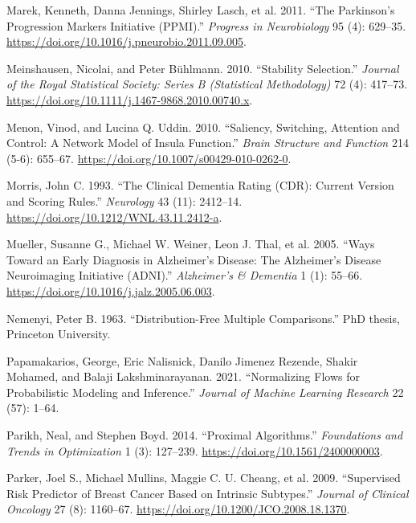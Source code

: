 \documentclass[
  10pt,
  letterpaper,
]{report}
\newlength{\cslhangindent}
\newenvironment{CSLReferences}[2] %
 {\begin{list}{}{%
  \setlength{\itemindent}{0pt}
  \setlength{\leftmargin}{0pt}
  \setlength{\parsep}{0pt}
  \ifodd #1
   \setlength{\leftmargin}{\cslhangindent}
   \setlength{\itemindent}{-1\cslhangindent}
  \fi
  \setlength{\itemsep}{#2\baselineskip}}}
 {\end{list}}
\begin{document}
\begin{CSLReferences}{1}{1}
{Marek, Kenneth, Danna Jennings, Shirley Lasch, et al.} 2011. {``The
{Parkinson's Progression Markers Initiative} ({PPMI}).''} \emph{Progress
in Neurobiology} 95 (4): 629--35.
\url{https://doi.org/10.1016/j.pneurobio.2011.09.005}.

Meinshausen, Nicolai, and Peter Bühlmann. 2010. {``Stability
Selection.''} \emph{Journal of the Royal Statistical Society: Series B
(Statistical Methodology)} 72 (4): 417--73.
\url{https://doi.org/10.1111/j.1467-9868.2010.00740.x}.

Menon, Vinod, and Lucina Q. Uddin. 2010. {``Saliency, Switching,
Attention and Control: A Network Model of Insula Function.''}
\emph{Brain Structure and Function} 214 (5-6): 655--67.
\url{https://doi.org/10.1007/s00429-010-0262-0}.

Morris, John C. 1993. {``The {Clinical Dementia Rating} ({CDR}): Current
Version and Scoring Rules.''} \emph{Neurology} 43 (11): 2412--14.
\url{https://doi.org/10.1212/WNL.43.11.2412-a}.

Mueller, Susanne G., Michael W. Weiner, Leon J. Thal, et al. 2005.
{``Ways Toward an Early Diagnosis in {Alzheimer's} Disease: The
{Alzheimer's Disease Neuroimaging Initiative} ({ADNI}).''}
\emph{Alzheimer's \& Dementia} 1 (1): 55--66.
\url{https://doi.org/10.1016/j.jalz.2005.06.003}.

Nemenyi, Peter B. 1963. {``Distribution-Free Multiple Comparisons.''}
PhD thesis, Princeton University.

Papamakarios, George, Eric Nalisnick, Danilo Jimenez Rezende, Shakir
Mohamed, and Balaji Lakshminarayanan. 2021. {``Normalizing Flows for
Probabilistic Modeling and Inference.''} \emph{Journal of Machine
Learning Research} 22 (57): 1--64.

Parikh, Neal, and Stephen Boyd. 2014. {``Proximal Algorithms.''}
\emph{Foundations and Trends in Optimization} 1 (3): 127--239.
\url{https://doi.org/10.1561/2400000003}.

{Parker, Joel S., Michael Mullins, Maggie C. U. Cheang, et al.} 2009.
{``Supervised Risk Predictor of Breast Cancer Based on Intrinsic
Subtypes.''} \emph{Journal of Clinical Oncology} 27 (8): 1160--67.
\url{https://doi.org/10.1200/JCO.2008.18.1370}.


\end{CSLReferences}
\end{document}

